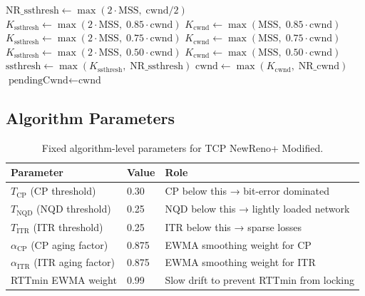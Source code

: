 \documentclass[12pt,a4paper]{article}
\begin{document}
\begin{algorithm}[H]
\caption{Three-Factor Slowdown Action (NewReno+ Modified)}
\begin{algorithmic}[1]
\State $\text{NR\_ssthresh} \gets \max(2\cdot\text{MSS},\;\text{cwnd}/2)$
  \State $K_\text{ssthresh} \gets \max(2\cdot\text{MSS},\;0.85\cdot\text{cwnd})$
  \State $K_\text{cwnd}     \gets \max(\text{MSS},\;      0.85\cdot\text{cwnd})$
  \State $K_\text{ssthresh} \gets \max(2\cdot\text{MSS},\;0.75\cdot\text{cwnd})$
  \State $K_\text{cwnd}     \gets \max(\text{MSS},\;      0.75\cdot\text{cwnd})$
\Else
  \State $K_\text{ssthresh} \gets \max(2\cdot\text{MSS},\;0.50\cdot\text{cwnd})$
  \State $K_\text{cwnd}     \gets \max(\text{MSS},\;      0.50\cdot\text{cwnd})$
\EndIf
\State $\text{ssthresh} \gets \max(K_\text{ssthresh},\;\text{NR\_ssthresh})$
\State $\text{cwnd}     \gets \max(K_\text{cwnd},\;\text{NR\_cwnd})$
  \State $\text{pendingCwnd} \gets \text{cwnd}$
\EndIf
\end{algorithmic}
\end{algorithm}

\subsection{Algorithm Parameters}

\begin{table}[H]
\centering
\renewcommand{\arraystretch}{1.3}
\begin{tabular}{@{}llp{7.5cm}@{}}
\toprule
\textbf{Parameter} & \textbf{Value} & \textbf{Role} \\
\midrule
$T_\text{CP}$  (CP threshold)          & 0.30  & CP below this → bit-error dominated \\
$T_\text{NQD}$ (NQD threshold)         & 0.25  & NQD below this → lightly loaded network \\
$T_\text{ITR}$ (ITR threshold)         & 0.25  & ITR below this → sparse losses \\
$\alpha_\text{CP}$  (CP aging factor)  & 0.875 & EWMA smoothing weight for CP \\
$\alpha_\text{ITR}$ (ITR aging factor) & 0.875 & EWMA smoothing weight for ITR \\
RTTmin EWMA weight                     & 0.99  & Slow drift to prevent RTTmin from locking \\
\bottomrule
\end{tabular}
\caption{Fixed algorithm-level parameters for TCP NewReno+ Modified.}
\end{table}
\end{document}
